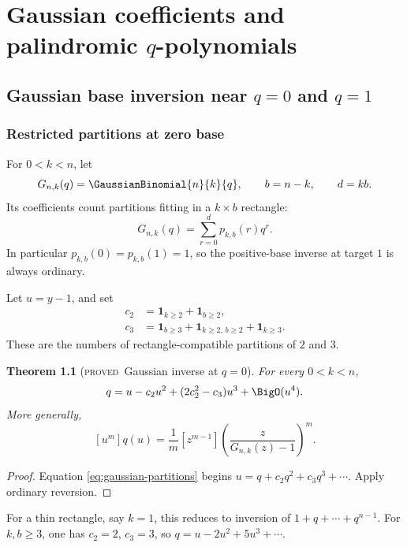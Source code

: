 \documentclass[11pt,letterpaper,oneside,openany]{book}
\newtheorem{theorem}{Theorem}[chapter]
\theoremstyle{definition}
\theoremstyle{remark}
\newcommand{\statusproved}{\textcolor{provedgreen}{\textsc{proved}}}
\newcommand{\ind}{\mathbf{1}}
\begin{document}
\part{Gaussian coefficients and palindromic \(q\)-polynomials}

\chapter{Gaussian base inversion near \(q=0\) and \(q=1\)}

\section{Restricted partitions at zero base}
For \(0<k<n\), let
\[
 G_{n,k}(q)=\GaussianBinomial{n}{k}{q},
 \qquad b=n-k,
 \qquad d=kb.
\]
Its coefficients count partitions fitting in a \(k\times b\) rectangle:
\begin{equation}
 G_{n,k}(q)=\sum_{r=0}^{d}p_{k,b}(r)q^r.
 \label{eq:gaussian-partitions}
\end{equation}
In particular \(p_{k,b}(0)=p_{k,b}(1)=1\), so the positive-base inverse at
target \(1\) is always ordinary.

Let \(u=y-1\), and set
\begin{align}
 c_2&=\ind_{k\ge2}+\ind_{b\ge2}, \\
 c_3&=\ind_{b\ge3}+\ind_{k\ge2,\,b\ge2}+\ind_{k\ge3}.
 \label{eq:c2c3-rectangle}
\end{align}
These are the numbers of rectangle-compatible partitions of \(2\) and \(3\).

\begin{theorem}[\statusproved\ Gaussian inverse at \(q=0\)]
For every \(0<k<n\),
\begin{equation}
 q=u-c_2u^2+(2c_2^2-c_3)u^3+\BigO(u^4).
 \label{eq:gaussian-q0-inverse}
\end{equation}
More generally,
\[
 [u^m]q(u)=\frac1m[z^{m-1}]
 \left(\frac{z}{G_{n,k}(z)-1}\right)^m.
\]
\end{theorem}
\begin{proof}
Equation \cref{eq:gaussian-partitions} begins
\(u=q+c_2q^2+c_3q^3+\cdots\).  Apply ordinary reversion.
\end{proof}

For a thin rectangle, say \(k=1\), this reduces to inversion of
\(1+q+\cdots+q^{n-1}\).  For \(k,b\ge3\), one has \(c_2=2\), \(c_3=3\), so
\(q=u-2u^2+5u^3+\cdots\).
\end{document}
